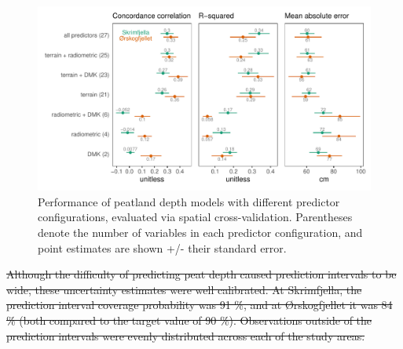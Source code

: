 \documentclass[soil, manuscript]{copernicus}
\providecommand{\DIFdel}[1]{{\protect\color{red}\sout{#1}}}                      %
\providecommand{\DIFdelbegin}{} %
\providecommand{\DIFaddbeginFL}{} %
\providecommand{\DIFaddendFL}{} %
\providecommand{\DIFdelbeginFL}{} %
\providecommand{\DIFdelendFL}{} %
\begin{document}
\begin{figure}
\DIFdelbeginFL %
\DIFdelendFL \DIFaddbeginFL \includegraphics[width=1\linewidth]{figures/modelmetrics} \DIFaddendFL \caption{\DIFdelbeginFL %
\DIFdelendFL Performance of peatland depth models with different predictor configurations, evaluated via spatial cross-validation. Parentheses denote the number of variables in each predictor configuration, and point estimates are shown +/- their standard error.}\DIFaddbeginFL \label{fig:modelMetrics}
\DIFaddendFL \end{figure}

\DIFdelbegin \DIFdel{Although the difficulty of predicting peat depth caused prediction intervals to be wide, these uncertainty estimates were well calibrated.
At Skrimfjella, the prediction interval coverage probability was 91 \%, and at Ørskogfjellet it was 84 \% (both compared to the target value of 90 \%).
Observations outside of the prediction intervals were evenly distributed across each of the study areas.
}%
\end{document}
